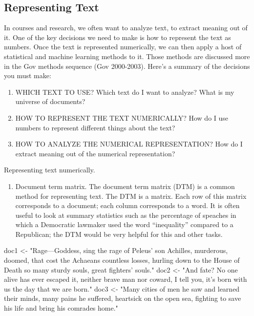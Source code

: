 \documentclass[]{book}
\newenvironment{Shaded}{\begin{snugshade}}{\end{snugshade}}
\newcommand{\NormalTok}[1]{#1}
\newcommand{\StringTok}[1]{\textcolor[rgb]{0.31,0.60,0.02}{#1}}
\providecommand{\tightlist}{%
  \setlength{\itemsep}{0pt}\setlength{\parskip}{0pt}}
\theoremstyle{definition}
\theoremstyle{definition}
\theoremstyle{definition}
\theoremstyle{remark}
\begin{document}
\begin{Shaded}
\begin{Highlighting}[]
\begin{Shaded}
\begin{Highlighting}[]
\begin{Shaded}
\begin{Highlighting}[]
\hypertarget{representing-text}{%
\section{Representing Text}\label{representing-text}}

In courses and research, we often want to analyze text, to extract meaning out of it.
One of the key decisions we need to make is how to represent the text as numbers.
Once the text is represented numerically, we can then apply a host of statistical
and machine learning methods to it. Those methods are discussed more in the Gov methods sequence (Gov 2000-2003). Here's a summary of the decisions you must make:

\begin{enumerate}
\def\labelenumi{\arabic{enumi}.}
\tightlist
\item
  WHICH TEXT TO USE? Which text do I want to analyze? What is my universe of documents?
\item
  HOW TO REPRESENT THE TEXT NUMERICALLY? How do I use numbers to represent different things about the text?
\item
  HOW TO ANALYZE THE NUMERICAL REPRESENTATION? How do I extract meaning out of the numerical representation?
\end{enumerate}

Representing text numerically.

\begin{enumerate}
\def\labelenumi{\arabic{enumi}.}
\tightlist
\item
  Document term matrix. The document term matrix (DTM) is a common method for representing text. The DTM is a matrix. Each row of this matrix corresponds to a document; each column corresponds to a word. It is often useful to look at summary statistics such as the percentage of speaches in which a Democratic lawmaker used the word ``inequality'' compared to a Republican; the DTM would be very helpful for this and other tasks.
\end{enumerate}

\begin{Shaded}
\begin{Highlighting}[]
\NormalTok{doc1 <-}\StringTok{ "Rage---Goddess, sing the rage of Peleus’ son Achilles,}
\StringTok{         murderous, doomed, that cost the Achaeans countless losses,}
\StringTok{         hurling down to the House of Death so many sturdy souls,}
\StringTok{         great fighters’ souls."}
\NormalTok{doc2 <-}\StringTok{ "And fate? No one alive has ever escaped it,}
\StringTok{         neither brave man nor coward, I tell you, }
\StringTok{         it's born with us the day that we are born."}
\NormalTok{doc3 <-}\StringTok{ "Many cities of men he saw and learned their minds,}
\StringTok{         many pains he suffered, heartsick on the open sea,}
\StringTok{         fighting to save his life and bring his comrades home."}
\end{Highlighting}
\end{Shaded}


\end{Highlighting}
\end{Shaded}
\end{Highlighting}
\end{Shaded}
\end{Highlighting}
\end{Shaded}
\end{document}

